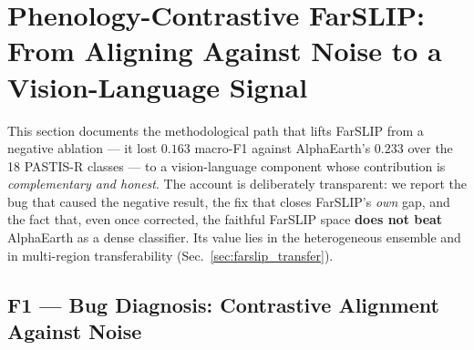 %
%

\section{Phenology-Contrastive FarSLIP: From Aligning Against Noise to a
Vision-Language Signal}
\label{sec:farslip_method}

This section documents the methodological path that lifts FarSLIP from a negative
ablation --- it lost $0.163$ macro-F1 against AlphaEarth's $0.233$ over the 18
PASTIS-R classes --- to a vision-language component whose contribution is
\textit{complementary and honest}. The account is deliberately transparent: we
report the bug that caused the negative result, the fix that closes FarSLIP's
\textit{own} gap, and the fact that, even once corrected, the faithful FarSLIP
space \textbf{does not beat} AlphaEarth as a dense classifier. Its value lies in
the heterogeneous ensemble and in multi-region transferability
(Sec.~\ref{sec:farslip_transfer}).

\subsection{F1 --- Bug Diagnosis: Contrastive Alignment Against Noise}
\label{sec:farslip_f1}

